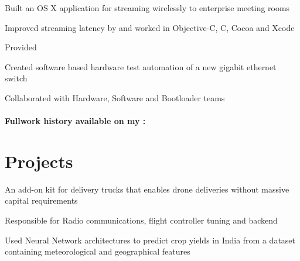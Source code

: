 \documentclass[]{deedy-resume-openfont}
\begin{document}
\begin{minipage}[t]{0.64\textwidth}
\begin{tightemize}
\item Built an OS X application for streaming wirelessly to enterprise meeting rooms 
\item Improved streaming latency by  and worked in Objective-C, C, Cocoa
  and Xcode
\item Provided 
\end{tightemize}
\sectionsep


\begin{tightemize}
\item Created software based hardware test automation of a new gigabit ethernet switch
\item Collaborated with Hardware, Software and Bootloader teams 
\end{tightemize}
\sectionsep
\paragraph{Fullwork history available on my : \href{https://www.linkedin.com/in/prajnak}{}}


\section{Projects}
\begin{tightemize}
\item An add-on kit for delivery trucks that enables drone deliveries without massive capital requirements
\item Responsible for Radio communications, flight controller tuning and backend
\end{tightemize}
\sectionsep

\begin{tightemize}
\item Used Neural Network architectures to predict crop yields in India from a
  dataset containing meteorological and geographical features
\end{tightemize}
\sectionsep


\end{minipage}
\end{document}
